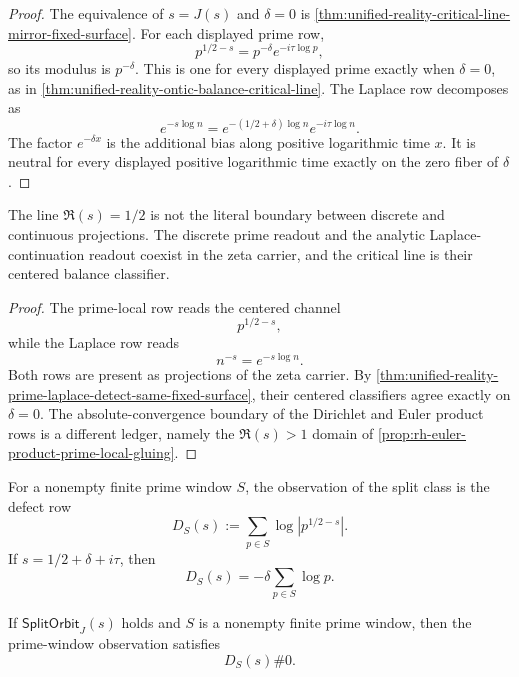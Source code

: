 \begin{proof}
The equivalence of $s=J(s)$ and $\delta=0$ is
\autoref{thm:unified-reality-critical-line-mirror-fixed-surface}.  For
each displayed prime row,
$$
p^{1/2-s}=p^{-\delta}e^{-i\tau\log p},
$$
so its modulus is $p^{-\delta}$.  This is one for every displayed
prime exactly when $\delta=0$, as in
\autoref{thm:unified-reality-ontic-balance-critical-line}.  The
Laplace row decomposes as
$$
e^{-s\log n}
=
e^{-(1/2+\delta)\log n}e^{-i\tau\log n}.
$$
The factor $e^{-\delta x}$ is the additional bias along positive
logarithmic time $x$.  It is neutral for every displayed positive
logarithmic time exactly on the zero fiber of $\delta$.
\end{proof}

\begin{corollary}
\label{cor:unified-reality-critical-line-balance-not-side-boundary}
The line $\Re(s)=1/2$ is not the literal boundary between discrete and
continuous projections.  The discrete prime readout and the analytic
Laplace-continuation readout coexist in the zeta carrier, and the
critical line is their centered balance classifier.
\end{corollary}

\begin{proof}
The prime-local row reads the centered channel
$$
p^{1/2-s},
$$
while the Laplace row reads
$$
n^{-s}=e^{-s\log n}.
$$
Both rows are present as projections of the zeta carrier.  By
\autoref{thm:unified-reality-prime-laplace-detect-same-fixed-surface},
their centered classifiers agree exactly on $\delta=0$.  The
absolute-convergence boundary of the Dirichlet and Euler product rows is a
different ledger, namely the $\Re(s)>1$ domain of
\autoref{prop:rh-euler-product-prime-local-gluing}.
\end{proof}

\begin{definition}
\label{def:unified-reality-prime-window-observation-split-class}
For a nonempty finite prime window $S$, the observation of the split
class is the defect row
$$
D_S(s)
:=
\sum_{p\in S}\log|p^{1/2-s}|.
$$
If $s=1/2+\delta+i\tau$, then
$$
D_S(s)
=
-\delta\sum_{p\in S}\log p.
$$
\end{definition}

\begin{theorem}
\label{thm:unified-reality-prime-windows-observe-split-orbits}
If $\mathsf{SplitOrbit}_{J}(s)$ holds and $S$ is a nonempty finite prime
window, then the prime-window observation satisfies
$$
D_S(s)\#0.
$$
\end{theorem}

